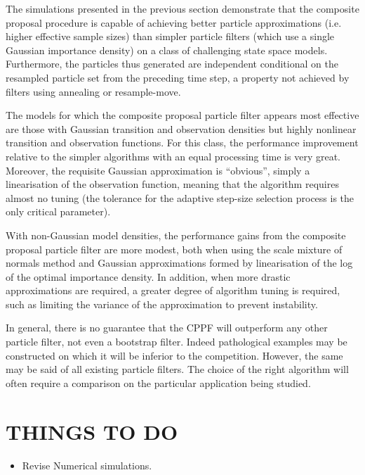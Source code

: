 \documentclass{article}
\begin{document}
The simulations presented in the previous section demonstrate that the composite proposal procedure is capable of achieving better particle approximations (i.e. higher effective sample sizes) than simpler particle filters (which use a single Gaussian importance density) on a class of challenging state space models. Furthermore, the particles thus generated are independent conditional on the resampled particle set from the preceding time step, a property not achieved by filters using annealing or resample-move.

The models for which the composite proposal particle filter appears most effective are those with Gaussian transition and observation densities but highly nonlinear transition and observation functions. For this class, the performance improvement relative to the simpler algorithms with an equal processing time is very great. Moreover, the requisite Gaussian approximation is ``obvious'', simply a linearisation of the observation function, meaning that the algorithm requires almost no tuning (the tolerance for the adaptive step-size selection process is the only critical parameter).

With non-Gaussian model densities, the performance gains from the composite proposal particle filter are more modest, both when using the scale mixture of normals method and Gaussian approximations formed by linearisation of the log of the optimal importance density. In addition, when more drastic approximations are required, a greater degree of algorithm tuning is required, such as limiting the variance of the approximation to prevent instability.

In general, there is no guarantee that the CPPF will outperform any other particle filter, not even a bootstrap filter. Indeed pathological examples may be constructed on which it will be inferior to the competition. However, the same may be said of all existing particle filters. The choice of the right algorithm will often require a comparison on the particular application being studied.



\section{THINGS TO DO}
\begin{itemize}
  \item Revise Numerical simulations.
\end{itemize}
\end{document}
